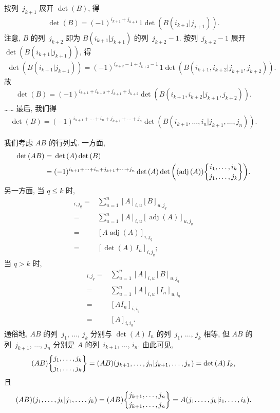 \documentclass[../libro.tex]{subfiles}
\begin{document}
按列~\(j_{k+1}\) 展开 \(\det {(B)}\), 得
\begin{align*}
    \det {(B)} = (-1)^{i_{k+1}+j_{k+1}} \, 1
    \det {(B(i_{k+1}|j_{j+1}))}.
\end{align*}
注意, \(B\) 的列~\(j_{k+2}\) 即为
\(B(i_{k+1}|j_{k+1})\) 的列~\(j_{k+2}-1\).
按列~\(j_{k+2}-1\) 展开 \(\det {(B(i_{k+1}|j_{k+1}))}\),
得
\begin{align*}
    \det {(B(i_{k+1}|j_{k+1}))} = (-1)^{i_{k+2}-1+j_{k+2}-1} \, 1
    \det {(B({i_{k+1},i_{k+2}}|{j_{k+1},j_{k+2}}))}.
\end{align*}
故
\begin{align*}
    \det {(B)} = (-1)^{i_{k+1}+i_{k+2}+j_{k+1}+j_{k+2}}
    \det {(B({i_{k+1},i_{k+2}}|{j_{k+1},j_{k+2}}))}.
\end{align*}
……
最后, 我们得
\begin{align*}
    \det {(B)}
    = (-1)^{i_{k+1}+\dots+i_n+j_{k+1}+\dots+j_n}
    \det {(B({i_{k+1},\dots,i_n}|{j_{k+1},\dots,j_n}))}.
\end{align*}

我们考虑 \(AB\) 的行列式.
一方面,
\begin{align*}
    \det {(AB)}
    = {} & \det {(A)} \det {(B)}
    \\
    = {} & (-1)^{i_{k+1}+\dots+i_n+j_{k+1}+\dots+j_n}
    \det {(A)}
    \det {\left(
            (\operatorname{adj} {(A)})
            \submat{i_1,\dots,i_k}{j_1,\dots,j_k}
    \right)}.
\end{align*}
另一方面, 当 \(q \leq k\) 时,
\begin{align*}
    [AB]_{i,j_q}
    = {} &
    \sum_{u=1}^{n} {[A]_{i,u} [B]_{u,j_q}}
    \\
    = {} &
    \sum_{u=1}^{n} {[A]_{i,u} [\operatorname{adj} {(A)}]_{u,j_q}}
    \\
    = {} &
    [A \operatorname{adj} {(A)}]_{i,j_q}
    \\
    = {} &
    [\det {(A)}\,I_n]_{i,j_q};
\end{align*}
当 \(q > k\) 时,
\begin{align*}
    [AB]_{i,j_q}
    = {} &
    \sum_{u=1}^{n} {[A]_{i,u} [B]_{u,j_q}}
    \\
    = {} &
    \sum_{u=1}^{n} {[A]_{i,u} [I_n]_{u,i_q}}
    \\
    = {} &
    [A I_n]_{i,i_q}
    \\
    = {} &
    [A]_{i,i_q}.
\end{align*}
通俗地, \(AB\) 的列~\(j_1\), \(\dots\), \(j_k\)
分别与 \(\det {(A)}\,I_n\) 的列~\(j_1\), \(\dots\), \(j_k\)
相等,
但 \(AB\) 的列~\(j_{k+1}\), \(\dots\), \(j_n\)
分别是 \(A\) 的列~\(i_{k+1}\), \(\dots\), \(i_n\).
由此可见,
\begin{align*}
    (AB)\submat{j_1,\dots,j_k}{j_1,\dots,j_k}
    = (AB)({j_{k+1},\dots,j_n}|{j_{k+1},\dots,j_n})
    = \det {(A)}\, I_k,
\end{align*}
且
\begin{align*}
    (AB)({j_1,\dots,j_k}|{j_1,\dots,j_k})
    = (AB)\submat{j_{k+1},\dots,j_n}{j_{k+1},\dots,j_n}
    = A({j_1,\dots,j_k}|{i_1,\dots,i_k}).
\end{align*}
\end{document}
